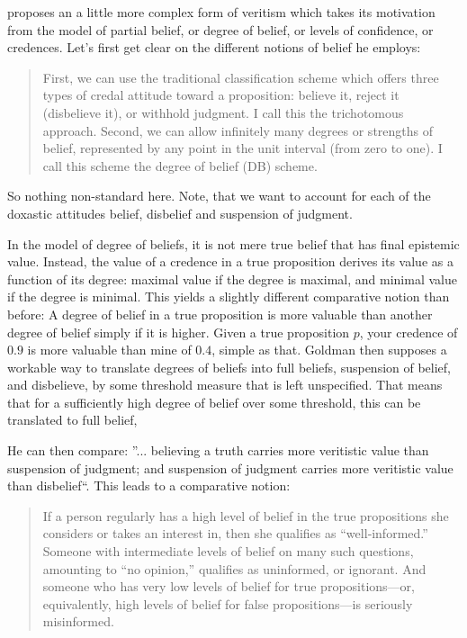 \documentclass[12pt,numbers=noenddot]{scrartcl}
\begin{document}
\textcite[58]{Goldman2002-GOLTUO-2} proposes an a little more complex form of veritism which takes its motivation from the model of partial belief, or degree of belief, or levels of confidence, or credences. Let's first get clear on the different notions of belief he employs:

\begin{quote}
    First, we can use the traditional classification scheme which offers three types of credal attitude toward a proposition: believe it, reject it (disbelieve it), or withhold judgment. I call this the trichotomous approach. Second, we can allow infinitely many degrees or strengths of belief, represented by any point in the unit interval (from zero to one). I call this scheme the degree of belief (DB) scheme. \textcite[88]{Goldman1999-GOLKIA}
\end{quote}

So nothing non-standard here. Note, that we want to account for each of the doxastic attitudes belief, disbelief and suspension of judgment.

In the model of degree of beliefs, it is not mere true belief that has final epistemic value. Instead, the value of a credence in a true proposition derives its value as a function of its degree: maximal value if the degree is maximal, and minimal value if the degree is minimal. This yields a slightly different comparative notion than before: A degree of belief in a true proposition is more valuable than another degree of belief simply if it is higher. Given a true proposition $p$, your credence of $0.9$ is more valuable than mine of $0.4$, simple as that.
Goldman then supposes a workable way to translate degrees of beliefs into full beliefs, suspension of belief, and disbelieve, by some threshold measure that is left unspecified. That means that for a sufficiently high degree of belief over some threshold, this can be translated to full belief, 

 He can then compare: ”... believing a truth carries more veritistic value than suspension of judgment; and suspension of judgment carries more veritistic value than disbelief“. This leads to a comparative notion:

\begin{quote}
    If a person regularly has a high level of belief in the true propositions she considers or takes an interest in, then she qualifies as “well‐informed.” Someone with intermediate levels of belief on many such questions, amounting to “no opinion,” qualifies as uninformed, or ignorant. And someone who has very low levels of belief for true propositions—or, equivalently, high levels of belief for false propositions—is seriously misinformed. \textcite[58]{Goldman2002-GOLTUO-2}
\end{quote}
\end{document}
